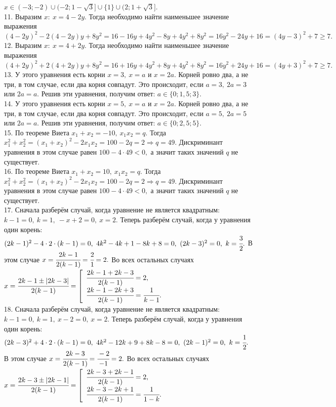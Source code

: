\documentclass[12pt]{article}
\begin{document}
$x\in(-3;-2)\cup(-2;1-\sqrt{3}]\cup\{1\}\cup(2;1+\sqrt{3}].$\\
11. Выразим $x:\ x=4-2y.$ Тогда необходимо найти наименьшее значение выражения $(4-2y)^2-2(4-2y)y+8y^2=16-16y+4y^2-8y+4y^2+8y^2=
16y^2-24y+16=(4y-3)^2+7\geqslant7.$\\
12. Выразим $x:\ x=4+2y.$ Тогда необходимо найти наименьшее значение выражения $(4+2y)^2+2(4+2y)y+8y^2=16+16y+4y^2+8y+4y^2+8y^2=
16y^2+24y+16=(4y+3)^2+7\geqslant7.$\\
13. У этого уравнения есть корни $x=3,\ x=a$ и $x=2a.$ Корней ровно два, а не три, в том случае, если два корня совпадут. Это происходит, если $a=3,\ 2a=3$ или $2a=a.$ Решив эти уравнения, получим ответ: $a\in\{0; 1,5;3\}.$\\
14. У этого уравнения есть корни $x=5,\ x=a$ и $x=2a.$ Корней ровно два, а не три, в том случае, если два корня совпадут. Это происходит, если $a=5,\ 2a=5$ или $2a=a.$ Решив эти уравнения, получим ответ: $a\in\{0; 2,5;5\}.$\\
15. По теореме Виета $x_1+x_2=-10,\ x_1x_2=q.$ Тогда $x_1^2+x_2^2=(x_1+x_2)^2-2x_1x_2=100-2q=2\Rightarrow q=49.$ Дискриминант уравнения в этом случае равен $100-4\cdot49<0,$ а значит таких значений $q$ не существует.\\
16. По теореме Виета $x_1+x_2=10,\ x_1x_2=q.$ Тогда $x_1^2+x_2^2=(x_1+x_2)^2-2x_1x_2=100-2q=2\Rightarrow q=49.$ Дискриминант уравнения в этом случае равен $100-4\cdot49<0,$ а значит таких значений $q$ не существует.\\
17. Сначала разберём случай, когда уравнение не является квадратным: $k-1=0,\ k=1,\ -x+2=0,\ x=2.$ Теперь разберём случай, когда у уравнения один корень:
$(2k-1)^2-4\cdot2\cdot(k-1)=0,\ 4k^2-4k+1-8k+8=0,\ (2k-3)^2=0,\ k=\cfrac{3}{2}.$ В этом случае $x=\cfrac{2k-1}{2(k-1)}=\cfrac{2}{1}=2.$ Во всех остальных случаях $x=\cfrac{2k-1\pm|2k-3|}{2(k-1)}=\left[\begin{array}{l}\cfrac{2k-1+2k-3}{2(k-1)}=2,\\ \cfrac{2k-1-2k+3}{2(k-1)}=\cfrac{1}{k-1}.\end{array}\right.$\\
18. Сначала разберём случай, когда уравнение не является квадратным: $k-1=0,\ k=1,\ x-2=0,\ x=2.$ Теперь разберём случай, когда у уравнения один корень:
$(2k-3)^2+4\cdot2\cdot(k-1)=0,\ 4k^2-12k+9+8k-8=0,\ (2k-1)^2=0,\ k=\cfrac{1}{2}.$ В этом случае $x=\cfrac{2k-3}{2(k-1)}=\cfrac{-2}{-1}=2.$ Во всех остальных случаях $x=\cfrac{2k-3\pm|2k-1|}{2(k-1)}=\left[\begin{array}{l}\cfrac{2k-3+2k-1}{2(k-1)}=2,\\ \cfrac{2k-3-2k+1}{2(k-1)}=\cfrac{1}{1-k}.\end{array}\right.$\\
\end{document}

